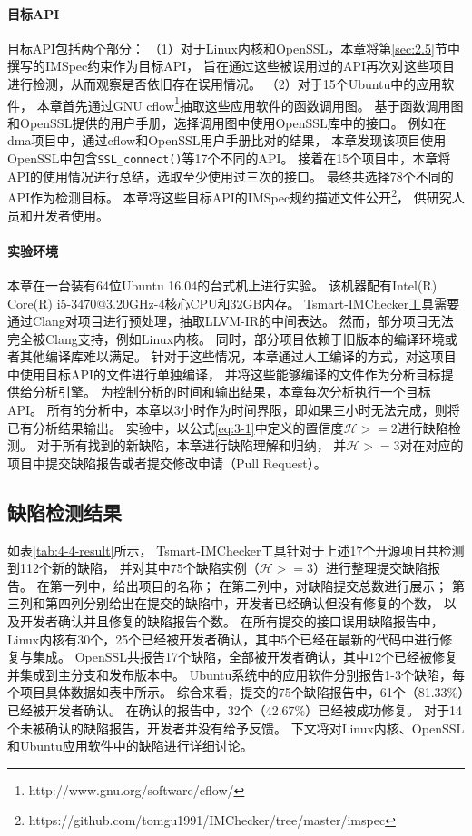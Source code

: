 \paragraph{目标API}
目标API包括两个部分：
（1）对于Linux内核和OpenSSL，本章将第\ref{sec:2.5}节中撰写的IMSpec约束作为目标API，
旨在通过这些被误用过的API再次对这些项目进行检测，从而观察是否依旧存在误用情况。
（2）对于15个Ubuntu中的应用软件，
本章首先通过GNU cflow\footnote{http://www.gnu.org/software/cflow/}抽取这些应用软件的函数调用图。
基于函数调用图和OpenSSL提供的用户手册，选择调用图中使用OpenSSL库中的接口。
例如在dma项目中，通过cflow和OpenSSL用户手册比对的结果，
本章发现该项目使用OpenSSL中包含\texttt{SSL\_connect()}等17个不同的API。
接着在15个项目中，本章将API的使用情况进行总结，选取至少使用过三次的接口。
最终共选择78个不同的API作为检测目标。
本章将这些目标API的IMSpec规约描述文件公开\footnote{https://github.com/tomgu1991/IMChecker/tree/master/imspec}，
供研究人员和开发者使用。




\paragraph{实验环境}
本章在一台装有64位Ubuntu 16.04的台式机上进行实验。
该机器配有Intel(R) Core(R) i5-3470@3.20GHz-4核心CPU和32GB内存。
Tsmart-IMChecker工具需要通过Clang对项目进行预处理，抽取LLVM-IR的中间表达。
然而，部分项目无法完全被Clang支持，例如Linux内核。
同时，部分项目依赖于旧版本的编译环境或者其他编译库难以满足。
针对于这些情况，本章通过人工编译的方式，对这项目中使用目标API的文件进行单独编译，
并将这些能够编译的文件作为分析目标提供给分析引擎。
为控制分析的时间和输出结果，本章每次分析执行一个目标API。
所有的分析中，本章以3小时作为时间界限，即如果三小时无法完成，则将已有分析结果输出。
实验中，以公式\ref{eq:3-1}中定义的置信度$\mathcal{H} >= 2$进行缺陷检测。
对于所有找到的新缺陷，本章进行缺陷理解和归纳，
并$\mathcal{H} >= 3$对在对应的项目中提交缺陷报告或者提交修改申请（Pull Request）。

\subsection{缺陷检测结果}

如表\ref{tab:4-4-result}所示，
Tsmart-IMChecker工具针对于上述17个开源项目共检测到112个新的缺陷，
并对其中75个缺陷实例（$\mathcal{H} >= 3$）进行整理提交缺陷报告。
在第一列中，给出项目的名称；
在第二列中，对缺陷提交总数进行展示；
第三列和第四列分别给出在提交的缺陷中，开发者已经确认但没有修复的个数，
以及开发者确认并且修复的缺陷报告个数。
在所有提交的接口误用缺陷报告中，
Linux内核有30个，25个已经被开发者确认，其中5个已经在最新的代码中进行修复与集成。
OpenSSL共报告17个缺陷，全部被开发者确认，其中12个已经被修复并集成到主分支和发布版本中。
Ubuntu系统中的应用软件分别报告1-3个缺陷，每个项目具体数据如表中所示。
综合来看，提交的75个缺陷报告中，61个（81.33\%）已经被开发者确认。
在确认的报告中，32个（42.67\%）已经被成功修复。
对于14个未被确认的缺陷报告，开发者并没有给予反馈。
下文将对Linux内核、OpenSSL和Ubuntu应用软件中的缺陷进行详细讨论。

